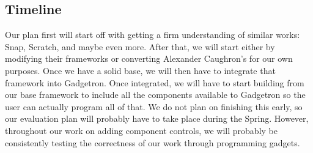 \documentclass[12pt]{article}
\begin{document}
\subsection{Timeline}
Our plan first will start off with getting a firm understanding of similar works: Snap, Scratch, and maybe even more. After that, we will start either by modifying their frameworks or converting Alexander Caughron's for our own purposes. Once we have a solid base, we will then have to integrate that framework into Gadgetron. Once integrated, we will have to start building from our base framework to include all the components available to Gadgetron so the user can actually program all of that. We do not plan on finishing this early, so our evaluation plan will probably have to take place during the Spring. However, throughout our work on adding component controls, we will probably be consistently testing the correctness of our work through programming gadgets.



\end{document}
